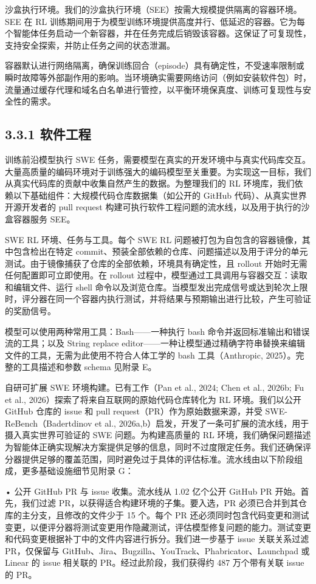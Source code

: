 沙盒执行环境。我们的沙盒执行环境（SEE）按需大规模提供隔离的容器环境。SEE 在 RL 训练期间用于为模型训练环境提供高度并行、低延迟的容器。它为每个智能体任务启动一个新容器，并在任务完成后销毁该容器。这保证了可复现性，支持安全探索，并防止任务之间的状态泄漏。

容器默认进行网络隔离，确保训练回合（episode）具有确定性，不受速率限制或瞬时故障等外部副作用的影响。当环境确实需要网络访问（例如安装软件包）时，流量通过缓存代理和域名白名单进行管控，以平衡环境保真度、训练可复现性与安全性的需求。

\subsection{3.3.1 软件工程}\label{software-engineering}

训练前沿模型执行 SWE 任务，需要模型在真实的开发环境中与真实代码库交互。大量高质量的编码环境对于训练强大的编码模型至关重要。为实现这一目标，我们从真实代码库的贡献中收集自然产生的数据。为整理我们的 RL 环境库，我们依赖以下基础组件：大规模代码仓库数据集（如公开的 GitHub 代码）、从真实世界开源开发者的 pull request 构建可执行软件工程问题的流水线，以及用于执行的沙盒容器服务 SEE。

SWE RL 环境、任务与工具。每个 SWE RL 问题被打包为自包含的容器镜像，其中包含检出在特定 commit、预装全部依赖的仓库、问题描述以及用于评分的单元测试。由于镜像捕获了仓库的全部依赖，环境具有确定性，且 rollout 开始时无需任何配置即可立即使用。在 rollout 过程中，模型通过工具调用与容器交互：读取和编辑文件、运行 shell 命令以及浏览仓库。当模型发出完成信号或达到轮次上限时，评分器在同一个容器内执行测试，并将结果与预期输出进行比较，产生可验证的奖励信号。

模型可以使用两种常用工具：Bash——一种执行 bash 命令并返回标准输出和错误流的工具；以及 String replace editor——一种让模型通过精确字符串替换来编辑文件的工具，无需为此使用不符合人体工学的 bash 工具（Anthropic, 2025）。完整的工具描述和参数 schema 见附录 E。

自研可扩展 SWE 环境构建。已有工作（Pan et al., 2024; Chen et al., 2026b; Fu et al., 2026）探索了将来自互联网的原始代码仓库转化为 RL 环境。我们以公开 GitHub 仓库的 issue 和 pull request（PR）作为原始数据来源，并受 SWE-ReBench（Badertdinov et al., 2026a,b）启发，开发了一条可扩展的流水线，用于摄入真实世界可验证的 SWE 问题。为构建高质量的 RL 环境，我们确保问题描述为智能体正确实现解决方案提供足够的信息，同时不过度限定任务。我们还确保评分器提供足够的覆盖范围，同时避免过于具体的评估标准。流水线由以下阶段组成，更多基础设施细节见附录 G：

• 公开 GitHub PR 与 issue 收集。流水线从 1.02 亿个公开 GitHub PR 开始。首先，我们过滤 PR，以获得适合构建环境的子集。要入选，PR 必须已合并到其仓库的主分支，且修改的文件少于 15 个。每个 PR 还必须同时包含代码变更和测试变更，以便评分器将测试变更用作隐藏测试，评估模型修复问题的能力。测试变更和代码变更根据补丁中的文件内容进行拆分。我们进一步基于 issue 关联关系过滤 PR，仅保留与 GitHub、Jira、Bugzilla、YouTrack、Phabricator、Launchpad 或 Linear 的 issue 相关联的 PR。经过此阶段，我们获得约 487 万个带有关联 issue 的 PR。

